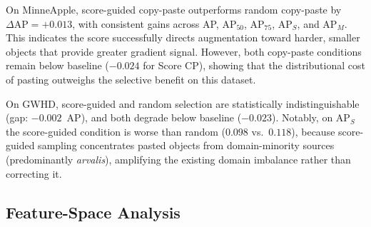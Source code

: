 \documentclass[conference]{IEEEtran}
\begin{document}
\begin{table}[t]
\centering
\caption{Three-seed mean COCO AP on original test sets.
  \textbf{Bold} = best copy-paste condition per dataset.}
\label{tab:results}
\end{table}

On MinneApple, score-guided copy-paste outperforms random copy-paste
by $\Delta\mathrm{AP}{=}{+}0.013$, with consistent gains across
AP, AP$_{50}$, AP$_{75}$, AP$_S$, and AP$_M$. This indicates
the score successfully directs augmentation toward harder, smaller
objects that provide greater gradient signal. However, both copy-paste
conditions remain below baseline ($-0.024$ for Score CP), showing
that the distributional cost of pasting outweighs the selective
benefit on this dataset.

On GWHD, score-guided and random selection are
statistically indistinguishable (gap: $-0.002$~AP), and both degrade
below baseline ($-0.023$). Notably, on AP$_S$ the score-guided
condition is worse than random ($0.098$ vs.\ $0.118$), because
score-guided sampling concentrates pasted objects from
domain-minority sources (predominantly \textit{arvalis}), amplifying
the existing domain imbalance rather than correcting it.

\subsection{Feature-Space Analysis}
\end{document}
